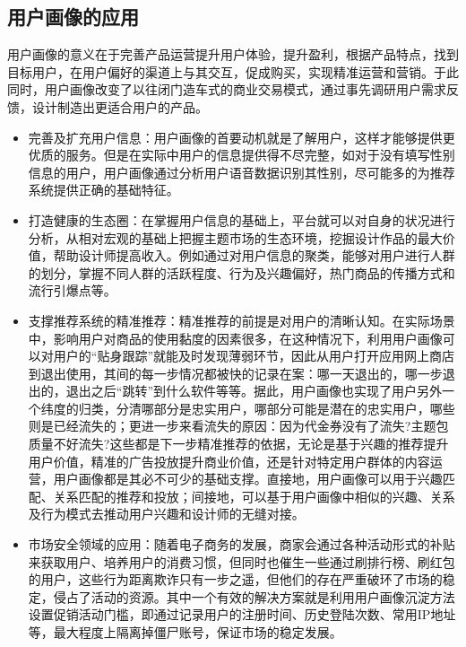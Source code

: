 	\subsection{用户画像的应用}
	用户画像的意义在于完善产品运营提升用户体验，提升盈利，根据产品特点，找到目标用户，在用户偏好的渠道上与其交互，促成购买，实现精准运营和营销。于此同时，用户画像改变了以往闭门造车式的商业交易模式，通过事先调研用户需求反馈，设计制造出更适合用户的产品。
	\begin{itemize}
	\item 完善及扩充用户信息：用户画像的首要动机就是了解用户，这样才能够提供更优质的服务。但是在实际中用户的信息提供得不尽完整，如对于没有填写性别信息的用户，用户画像通过分析用户语音数据识别其性别，尽可能多的为推荐系统提供正确的基础特征。
	\item 打造健康的生态圈：在掌握用户信息的基础上，平台就可以对自身的状况进行分析，从相对宏观的基础上把握主题市场的生态环境，挖掘设计作品的最大价值，帮助设计师提高收入。例如通过对用户信息的聚类，能够对用户进行人群的划分，掌握不同人群的活跃程度、行为及兴趣偏好，热门商品的传播方式和流行引爆点等。
	\item 支撑推荐系统的精准推荐：精准推荐的前提是对用户的清晰认知。在实际场景中，影响用户对商品的使用黏度的因素很多，在这种情况下，利用用户画像可以对用户的“贴身跟踪”就能及时发现薄弱环节，因此从用户打开应用网上商店到退出使用，其间的每一步情况都被快的记录在案：哪一天退出的，哪一步退出的，退出之后“跳转”到什么软件等等。据此，用户画像也实现了用户另外一个纬度的归类，分清哪部分是忠实用户，哪部分可能是潜在的忠实用户，哪些则是已经流失的；更进一步来看流失的原因：因为代金券没有了流失?主题包质量不好流失?这些都是下一步精准推荐的依据，无论是基于兴趣的推荐提升用户价值，精准的广告投放提升商业价值，还是针对特定用户群体的内容运营，用户画像都是其必不可少的基础支撑。直接地，用户画像可以用于兴趣匹配、关系匹配的推荐和投放；间接地，可以基于用户画像中相似的兴趣、关系及行为模式去推动用户兴趣和设计师的无缝对接。
	\item 市场安全领域的应用：随着电子商务的发展，商家会通过各种活动形式的补贴来获取用户、培养用户的消费习惯，但同时也催生一些通过刷排行榜、刷红包的用户，这些行为距离欺诈只有一步之遥，但他们的存在严重破环了市场的稳定，侵占了活动的资源。其中一个有效的解决方案就是利用用户画像沉淀方法设置促销活动门槛，即通过记录用户的注册时间、历史登陆次数、常用IP地址等，最大程度上隔离掉僵尸账号，保证市场的稳定发展。
	\end{itemize}

